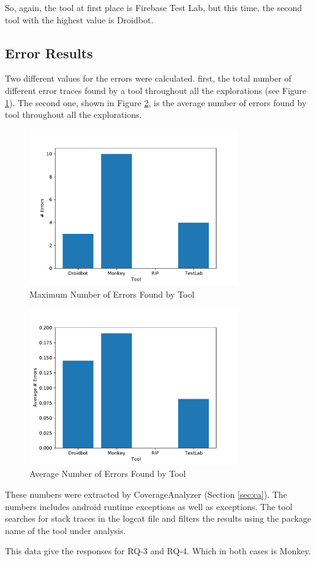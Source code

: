 So, again, the tool at first place is Firebase Test Lab, but this time, the second tool with the highest value is Droidbot.

\subsection{Error Results}\label{sec:errorResults}

Two different values for the errors were calculated. first, the total number of different error traces found by a tool throughout all the explorations (see Figure \ref{fig:maxerrors}). The second one, shown in Figure \ref{fig:averagaerrors}, is the average number of errors found by tool throughout all the explorations. 

\begin{figure}[h]
\centering
\includegraphics[width=0.8\textwidth]{../Figures/maxErrors.pdf}
\caption{Maximum Number of Errors Found by Tool}\label{fig:maxerrors}
\end{figure}

\begin{figure}[h]
\centering
\includegraphics[width=0.8\textwidth]{../Figures/averageErrors.pdf}
\caption{Average Number of Errors Found by Tool}\label{fig:averagaerrors}
\end{figure}

These numbers were extracted by CoverageAnalyzer (Section \ref{sec:ca}). The numbers includes android runtime exceptions as well as exceptions. The tool searches for stack traces in the logcat file and filters the results using the package name of the tool under analysis. 

This data give the responses for RQ-3 and RQ-4. Which in both cases is Monkey.

